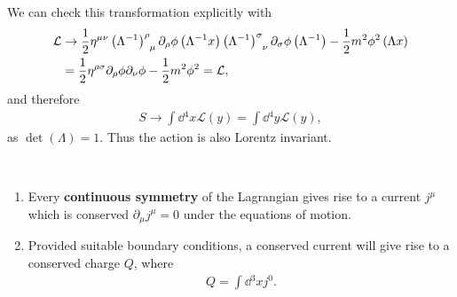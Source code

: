 
We can check this transformation explicitly with
\begin{align}
    \mathcal{L} &\to \frac{1}{2}\eta^{\mu \nu} \tensor{\left( \Lambda^{-1} \right) }{^{\rho}_\mu} \partial_\rho \phi \left( \Lambda^{-1} x \right) \tensor{\left( \Lambda^{-1} \right) }{^{\sigma}_{\nu}} \partial_\sigma \phi \left( \Lambda^{-1} \right) -\frac{1}{2}m^2 \phi^2 \left( \Lambda x \right) \\
    &= \frac{1}{2} \eta^{\rho \sigma} \partial_\rho \phi \partial_\nu \phi - \frac{1}{2} m^2 \phi^2 = \mathcal{L}
,\end{align}
and therefore
\begin{align}
    S \to \int \dd{^{4}x} \mathcal{L}\left( y \right) = \int \dd{^{4}y} \mathcal{L}\left( y \right) 
,\end{align}
as $\det \left( \Lambda \right) = 1$. Thus the action is also Lorentz invariant.

\begin{theorem}~
    \begin{enumerate}[label=\arabic*)]
        \item Every \textbf{continuous symmetry} of the Lagrangian gives rise to a current $j^{\mu}$ which is conserved $\partial_\mu j^{\mu} = 0$ under the equations of motion.
        \item Provided suitable boundary conditions, a conserved current will give rise to a conserved charge $Q$, where
            \begin{align}
                Q = \int \dd{^3x} j^{0}
            .\end{align}
    \end{enumerate}
\end{theorem}

